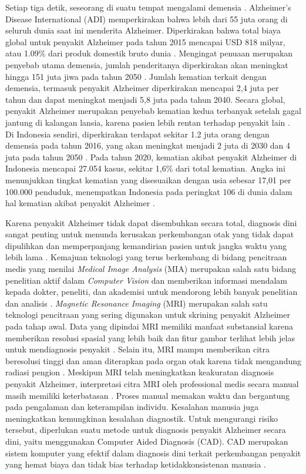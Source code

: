     Setiap tiga detik, seseorang di suatu tempat mengalami demensia \autocite{Long2024}. Alzheimer's Disease International (ADI) memperkirakan bahwa lebih dari 55 juta orang di seluruh dunia saat ini menderita Alzheimer. Diperkirakan bahwa total biaya global untuk penyakit Alzheimer pada tahun 2015 mencapai USD 818 milyar, atau 1.09\% dari produk domestik bruto dunia \autocite{AlzheimersDiseaseInternational2022}. Mengingat penuaan merupakan penyebab utama demensia, jumlah penderitanya diperkirakan akan meningkat hingga 151 juta jiwa pada tahun 2050 \autocite{Prince2015}. Jumlah kematian terkait dengan demensia, termasuk penyakit Alzheimer diperkirakan mencapai 2,4 juta per tahun dan dapat meningkat menjadi 5,8 juta pada tahun 2040. Secara global, penyakit Alzheimer merupakan penyebab kematian kedua terbanyak setelah gagal jantung di kalangan lansia, karena pasien lebih rentan terhadap penyakit lain \autocite{Breijyeh2021,Liang2021}. Di Indonesia sendiri, diperkirakan terdapat sekitar 1.2 juta orang dengan demensia pada tahun 2016, yang akan meningkat menjadi 2 juta di 2030 dan 4 juta pada tahun 2050 \autocite{AlzheimersIndonesia2019}. Pada tahun 2020, kematian akibat penyakit Alzheimer di Indonesia mencapai 27.054 kasus, sekitar 1,6\% dari total kematian. Angka ini menunjukkan tingkat kematian yang disesuaikan dengan usia sebesar 17,01 per 100.000 penduduk, menempatkan Indonesia pada peringkat 106 di dunia dalam hal kematian akibat penyakit Alzheimer \autocite{WebAlzheimerDementia}. 

    Karena penyakit Alzheimer tidak dapat disembuhkan secara total, diagnosis dini sangat penting untuk menunda kerusakan perkembangan otak yang tidak dapat dipulihkan dan memperpanjang kemandirian pasien untuk jangka waktu yang lebih lama \autocite{Shamrat2023}. Kemajuan teknologi yang terus berkembang di bidang pencitraan medis yang menilai \textit{Medical Image Analysis} (MIA) merupakan salah satu bidang penelitian aktif dalam \textit{Computer Vision} dan memberikan informasi mendalam kepada dokter, peneliti, dan akademisi untuk mendorong lebih banyak penelitian dan analisis \autocite{McKhann2012}. \textit{Magnetic Resonance Imaging} (MRI) merupakan salah satu teknologi pencitraan yang sering digunakan untuk skrining penyakit Alzheimer pada tahap awal. Data yang dipindai MRI memiliki manfaat substansial karena memberikan resolusi spasial yang lebih baik dan fitur gambar terlihat lebih jelas untuk mendiagnosis penyakit \autocite{El-Assy2024}. Selain itu, MRI mampu memberikan citra beresolusi tinggi dan aman diterapkan pada organ otak karena tidak mengandung radiasi pengion \autocite{CitraR2024}. Meskipun MRI telah meningkatkan keakuratan diagnosis penyakit Alzheimer, interpretasi citra MRI oleh professional medis secara manual masih memiliki keterbatasan \autocite{Ismail2024}. Proses manual memakan waktu dan bergantung pada pengalaman dan keterampilan individu. Kesalahan manusia juga meningkatkan kemungkinan kesalahan diagnostik. Untuk mengurangi risiko tersebut, diperlukan suatu metode untuk diagnosis penyakit Alzheimer secara dini, yaitu menggunakan Computer Aided Diagnosis (CAD). CAD merupakan sistem komputer yang efektif dalam diagnosis dini terkait perkembangan penyakit yang hemat biaya dan tidak bias terhadap ketidakkonsistenan manusia \autocite{Lazli2019}.


